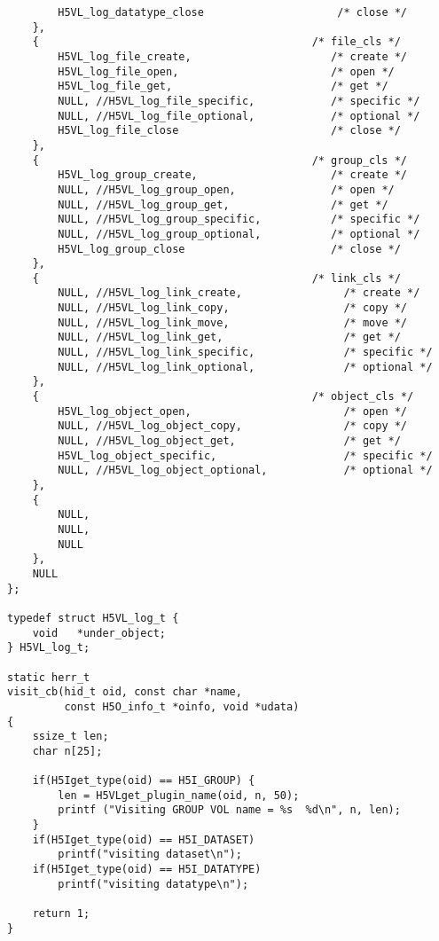 \begin{appendices}
\begin{lstlisting}
        H5VL_log_datatype_close                     /* close */
    },
    {                                           /* file_cls */
        H5VL_log_file_create,                      /* create */
        H5VL_log_file_open,                        /* open */
        H5VL_log_file_get,                         /* get */
        NULL, //H5VL_log_file_specific,            /* specific */
        NULL, //H5VL_log_file_optional,            /* optional */
        H5VL_log_file_close                        /* close */
    },
    {                                           /* group_cls */
        H5VL_log_group_create,                     /* create */
        NULL, //H5VL_log_group_open,               /* open */
        NULL, //H5VL_log_group_get,                /* get */
        NULL, //H5VL_log_group_specific,           /* specific */
        NULL, //H5VL_log_group_optional,           /* optional */
        H5VL_log_group_close                       /* close */
    },
    {                                           /* link_cls */
        NULL, //H5VL_log_link_create,                /* create */
        NULL, //H5VL_log_link_copy,                  /* copy */
        NULL, //H5VL_log_link_move,                  /* move */
        NULL, //H5VL_log_link_get,                   /* get */
        NULL, //H5VL_log_link_specific,              /* specific */
        NULL, //H5VL_log_link_optional,              /* optional */
    },
    {                                           /* object_cls */
        H5VL_log_object_open,                        /* open */
        NULL, //H5VL_log_object_copy,                /* copy */
        NULL, //H5VL_log_object_get,                 /* get */
        H5VL_log_object_specific,                    /* specific */
        NULL, //H5VL_log_object_optional,            /* optional */
    },
    {
        NULL,
        NULL,
        NULL
    },
    NULL
};

typedef struct H5VL_log_t {
    void   *under_object;
} H5VL_log_t;

static herr_t
visit_cb(hid_t oid, const char *name,
         const H5O_info_t *oinfo, void *udata)
{
    ssize_t len;
    char n[25];

    if(H5Iget_type(oid) == H5I_GROUP) {
        len = H5VLget_plugin_name(oid, n, 50);
        printf ("Visiting GROUP VOL name = %s  %d\n", n, len);
    }
    if(H5Iget_type(oid) == H5I_DATASET) 
        printf("visiting dataset\n");
    if(H5Iget_type(oid) == H5I_DATATYPE) 
        printf("visiting datatype\n");

    return 1;
}


\end{lstlisting}
\end{appendices}
